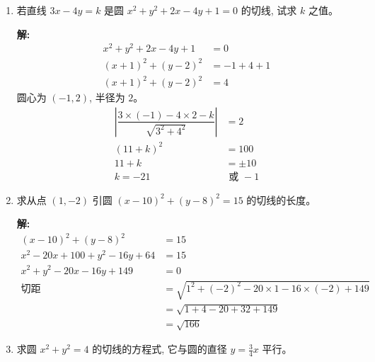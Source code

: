 \documentclass[10pt]{article}
\newcommand{\sol}{\textbf{解:} }
\begin{document}
\begin{enumerate}[leftmargin=*]
  \item 若直线 $3 x-4 y=k$ 是圆 $x^{2}+y^{2}+2 x-4 y+1=0$ 的切线, 试求 $k$ 之值。

        \sol{}
        \begin{align*}
          x^{2}+y^{2}+2 x-4 y+1 & = 0          \\
          (x+1)^{2}+(y-2)^{2}   & = -1 + 4 + 1 \\
          (x+1)^{2}+(y-2)^{2}   & = 4
        \end{align*}
        圆心为 $(-1, 2)$, 半径为 $2$。
        \begin{align*}
          \left\vert \dfrac{3 \times (-1) - 4 \times 2 - k}{\sqrt{3^{2} + 4^{2}}} \right\vert & = 2           \\
          (11 + k)^2                                                                          & = 100         \\
          11 + k                                                                              & = \pm 10      \\
          k = -21                                                                             & \text{ 或 } -1
        \end{align*}

        \newpage
  \item 求从点 $(1,-2)$ 引圆 $(x-10)^{2}+(y-8)^{2}=15$ 的切线的长度。

        \sol{}
        \begin{align*}
          (x-10)^{2}+(y-8)^{2}       & = 15                                                           \\
          x^{2}-20x+100+y^{2}-16y+64 & = 15                                                           \\
          x^{2}+y^{2}-20x-16y+149    & = 0                                                            \\
          \text{切距}                  & = \sqrt{1^{2} + (-2)^{2} - 20 \times 1 - 16 \times (-2) + 149} \\
                                     & = \sqrt{1 + 4 - 20 + 32 + 149}                                 \\
                                     & = \sqrt{166}
        \end{align*}

  \item 求圆 $x^{2}+y^{2}=4$ 的切线的方程式, 它与圆的直径 $y=\frac{3}{4} x$ 平行。


\end{enumerate}
\end{document}
